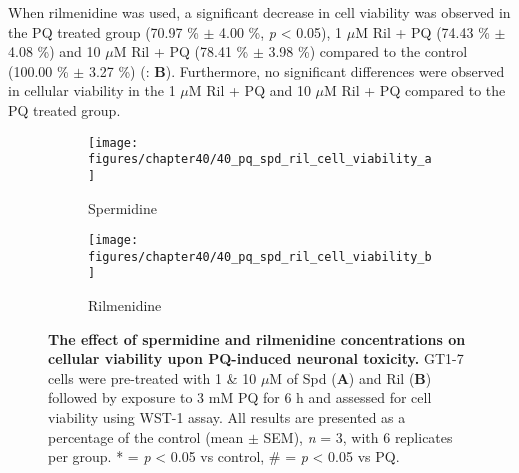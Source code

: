When rilmenidine was used, a significant decrease in cell viability was observed in the PQ treated group (70.97 \% $\pm$ 4.00 \%, \textit{p} < 0.05), 1 $\mu$M Ril + PQ (74.43 \% $\pm$ 4.08 \%) and 10 $\mu$M Ril + PQ (78.41 \% $\pm$ 3.98 \%) compared to the control (100.00 \% $\pm$ 3.27 \%) (: \textbf{B}). Furthermore, no significant differences were observed in cellular viability in the 1 $\mu$M Ril + PQ and 10 $\mu$M Ril + PQ compared to the PQ treated group.

\begin{figure}[H]
  \center
  \begin{subfigure}[b]{0.495\linewidth}
    \texttt{[image: figures/chapter40/40\_pq\_spd\_ril\_cell\_viability\_a]}
    \caption{Spermidine}
  \end{subfigure}
  \begin{subfigure}[b]{0.495\linewidth}
    \texttt{[image: figures/chapter40/40\_pq\_spd\_ril\_cell\_viability\_b]}
    \caption{Rilmenidine}
  \end{subfigure}
  \caption[The effect of spermidine and rilmenidine concentrations on cellular viability upon PQ-induced neuronal toxicity]{\textbf{The effect of spermidine and rilmenidine concentrations on cellular viability upon PQ-induced neuronal toxicity.} GT1-7 cells were pre-treated with 1 \& 10 $\mu$M of Spd (\textbf{A}) and Ril (\textbf{B}) followed by exposure to 3 mM PQ for 6 h and assessed for cell viability using WST-1 assay. All results are presented as a percentage of the control (mean $\pm$ SEM), \textit{n} = 3, with 6 replicates per group. * = \textit{p} < 0.05 vs control, \# = \textit{p} < 0.05 vs PQ.}
  \label{fig:40_pq_spd_ril_cell_viability_a}
\end{figure}

